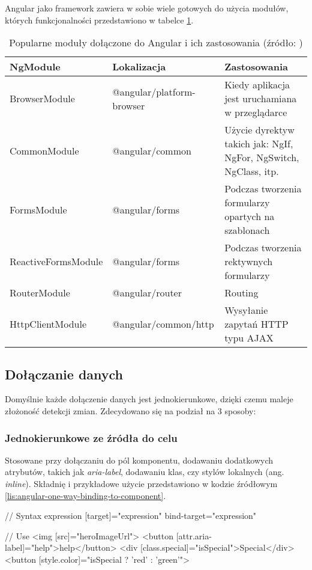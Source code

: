 	Angular jako framework zawiera w sobie wiele gotowych do użycia modułów, których funkcjonalności przedstawiono w tabelce \ref{tab:angular-frequent-modules}.
	
	\begin{center}
    	\begin{table}[ht]
    	\begin{tabular}{ | l | l | p{5.5cm} |}
    \hline
    NgModule & Lokalizacja & Zastosowania \\ \hline
    BrowserModule & @angular/platform-browser & Kiedy aplikacja jest uruchamiana w przeglądarce \\ \hline
	CommonModule & @angular/common & Użycie dyrektyw takich jak: NgIf, NgFor, NgSwitch, NgClass, itp. \\ \hline
	FormsModule & @angular/forms & Podczas tworzenia formularzy opartych na szablonach \\ \hline
	ReactiveFormsModule & @angular/forms & Podczas tworzenia rektywnych formularzy \\ \hline
	RouterModule & @angular/router & Routing \\ \hline
	HttpClientModule & @angular/common/http & Wysyłanie zapytań HTTP typu AJAX \\ \hline
    \end{tabular}
    	\caption{Popularne moduły dołączone do Angular i ich zastosowania (źródło: \cite{angular-frequent-modules})}
    	\label{tab:angular-frequent-modules}
    	\end{table}
	\end{center}
	
	\subsection{Dołączanie danych}
	Domyślnie każde dołączenie danych jest jednokierunkowe, dzięki czemu maleje złożoność detekcji zmian. Zdecydowano się na podział na 3 sposoby:
	
	\subsubsection*{Jednokierunkowe ze źródła do celu}
	Stosowane przy dołączaniu do pól komponentu, dodawaniu dodatkowych atrybutów, takich jak \textit{aria-label}, dodawaniu klas, czy stylów lokalnych (ang. \textit{inline}). Składnię i przykładowe użycie przedstawiono w kodzie źródłowym \ref{lis:angular-one-way-binding-to-component}.
	
	\begin{code}[
		language=javascript,
		caption={Składnia i użycie dołączenia jednokierunkowego ze źródła do celu (źródło: \cite{angular-template-syntax})},
		label={lis:angular-one-way-binding-to-component},
		escapechar=|,
		keywords={},
	]
// Syntax
{{expression}}
[target]="expression"
bind-target="expression"

// Use
<img [src]="heroImageUrl">
<button [attr.aria-label]="help">help</button>
<div [class.special]="isSpecial">Special</div>
<button [style.color]="isSpecial ? 'red' : 'green'">
	\end{code}
	
